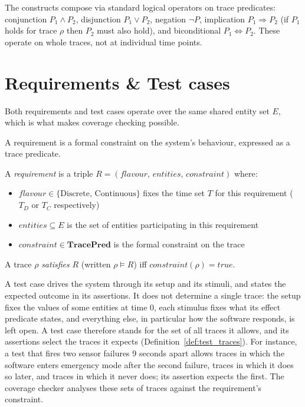 The constructs compose via standard logical operators on trace predicates:
conjunction $P_1 \land P_2$, disjunction $P_1 \lor P_2$, negation $\lnot P$,
implication $P_1 \Rightarrow P_2$ (if $P_1$ holds for trace $\rho$ then $P_2$ must also hold), and
biconditional $P_1 \Leftrightarrow P_2$.
These operate on whole traces, not at individual time points.

\section{Requirements \& Test cases}

Both requirements and test cases operate over the same shared entity set $E$, which is what makes coverage checking possible.

A requirement is a formal constraint on the system's behaviour, expressed as a trace predicate.

\begin{definition}[Requirement]\label{def:requirement}
    A \emph{requirement} is a triple $R = (\mathit{flavour},\, \mathit{entities},\, \mathit{constraint})$ where:
    \begin{itemize}
        \item $\mathit{flavour} \in \{\text{Discrete},\, \text{Continuous}\}$ fixes the time set $T$ for this requirement ($T_D$ or $T_C$ respectively)
        \item $\mathit{entities} \subseteq E$ is the set of entities participating in this requirement
        \item $\mathit{constraint} \in \mathbf{TracePred}$ is the formal constraint on the trace
    \end{itemize}
    A trace $\rho$ \emph{satisfies} $R$ (written $\rho \models R$) iff $\mathit{constraint}(\rho) = \mathit{true}$.
\end{definition}

A test case drives the system through its setup and its stimuli, and states the expected outcome in its assertions.
It does not determine a single trace: the setup fixes the values of some entities at time $0$, each stimulus fixes what its effect predicate states, and everything else, in particular how the software responds, is left open.
A test case therefore stands for the set of all traces it allows, and its assertions select the traces it expects (Definition~\ref{def:test_traces}).
For instance, a test that fires two sensor failures 9 seconds apart allows traces in which the software enters emergency mode after the second failure, traces in which it does so later, and traces in which it never does; its assertion expects the first.
The coverage checker analyses these sets of traces against the requirement's constraint.


